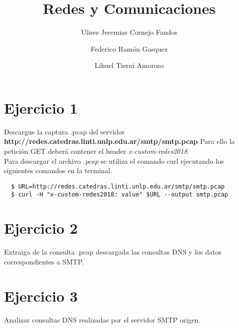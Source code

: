 \documentclass[osajnl,twocolumn,showpacs,superscriptaddress,10pt]{revtex4-1} %
\begin{document}
\title{Redes y Comunicaciones}

\author{Ulises Jeremias Cornejo Fandos}

\author{Federico Ramón Gasquez}

\author{Lihuel Tierni Amoroso}


\maketitle %

\onecolumngrid

\section{Ejercicio 1}

Descargue la captura .pcap del servidor \textbf{http://redes.catedras.linti.unlp.edu.ar/smtp/smtp.pcap} Para ello la petición GET deberá contener el header \textit{x-custom-redes2018}. \\

Para descargar el archivo \textit{.pcap} se utiliza el comando curl ejecutando los siguientes comandos en la terminal.

\begin{verbatim}
  $ URL=http://redes.catedras.linti.unlp.edu.ar/smtp/smtp.pcap
  $ curl -H "x-custom-redes2018: value" $URL --output smtp.pcap
\end{verbatim}

\section{Ejercicio 2}

Extraiga de la consulta .pcap descargada las consultas DNS y los datos correspondientes a SMTP. \\

\section{Ejercicio 3}

Analizar consultas DNS realizadas por el servidor SMTP origen.
\end{document}
